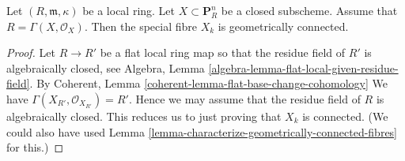 \begin{lemma}
\label{lemma-stein-projective}
Let $(R, \mathfrak m, \kappa)$ be a local ring.
Let $X \subset \mathbf{P}^n_R$ be a closed subscheme.
Assume that $R = \Gamma(X, \mathcal{O}_X)$. Then the special fibre
$X_k$ is geometrically connected.
\end{lemma}

\begin{proof}
Let $R \to R'$ be a flat local ring map so that the residue field of
$R'$ is algebraically closed, see
Algebra, Lemma \ref{algebra-lemma-flat-local-given-residue-field}.
By Coherent, Lemma \ref{coherent-lemma-flat-base-change-cohomology}
We have
$\Gamma(X_{R'}, \mathcal{O}_{X_{R'}}) = R'$.
Hence we may assume that the residue field of $R$ is algebraically
closed. This reduces us to just proving that $X_k$ is connected.
(We could also have used
Lemma \ref{lemma-characterize-geometrically-connected-fibres} for this.)


\end{proof}
